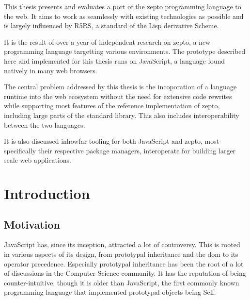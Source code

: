\documentclass[oneside,11pt,xetex]{scrbook}
\begin{document}

This thesis presents and evaluates a port of the zepto programming language to the web. It aims to
work as seamlessly with existing technologies as possible and is largely influenced by R5RS,
a standard of the Lisp derivative Scheme.

It is the result of over a year of independent research on zepto, a new programming language
targetting various environments. The prototype described here and implemented for this
thesis runs on JavaScript, a language found natively in many web browsers.

The central problem addressed by this thesis is the incoporation of a language runtime
into the web ecosystem without the need for extensive code rewrites while supporting
most features of the reference implementation of zepto, including large parts of the
standard library. This also includes interoperability between the two languages.

It is also discussed inhowfar tooling for both JavaScript and zepto, most specifically
their respective package managers, interoperate for building larger scale web applications.

\tableofcontents

\printglossary[type=\acronymtype,title=Abbreviations]

\mainmatter

\pagestyle{headings}

\chapter{Introduction}
\label{chap:intro}

\section{Motivation}
\label{sec:Motivation}

JavaScript has, since its inception, attracted a lot of controversy. This is rooted
in various aspects of its design, from prototypal inheritance and the \gls{dom} to
its operator precedence. Especially prototypal inheritance  has been the root
of a lot of discussions in the Computer Science community. It has the reputation of
being counter-intuitive, though it is older than JavaScript, the first commonly known
programming language that implemented prototypal objects being Self.
\end{document}
